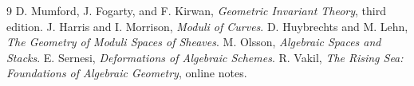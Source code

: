 \documentclass[11pt]{amsart}
\theoremstyle{definition}
\begin{document}
\begin{thebibliography}{9}
 D. Mumford, J. Fogarty, and F. Kirwan, \emph{Geometric Invariant Theory}, third edition.
 J. Harris and I. Morrison, \emph{Moduli of Curves}.
 D. Huybrechts and M. Lehn, \emph{The Geometry of Moduli Spaces of Sheaves}.
 M. Olsson, \emph{Algebraic Spaces and Stacks}.
 E. Sernesi, \emph{Deformations of Algebraic Schemes}.
 R. Vakil, \emph{The Rising Sea: Foundations of Algebraic Geometry}, online notes.
\end{thebibliography}
\end{document}
